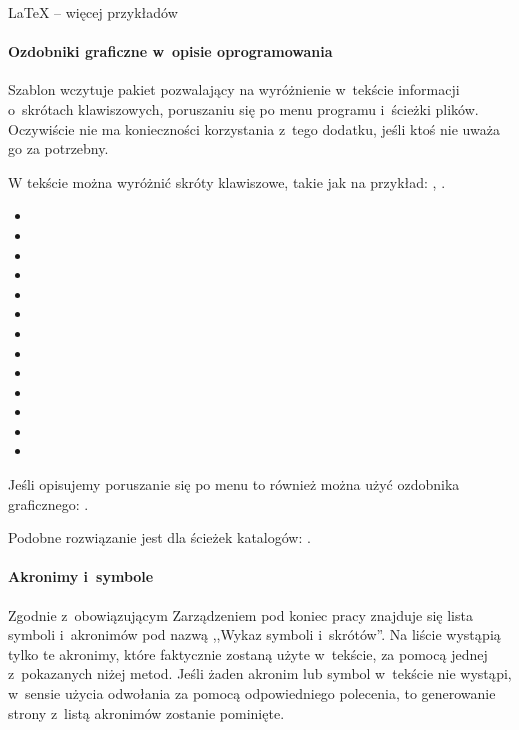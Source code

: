 \begin{easyappendix}{\LaTeX{} -- więcej przykładów}
\paragraph{Ozdobniki graficzne w~opisie oprogramowania}
Szablon wczytuje pakiet pozwalający na wyróżnienie w~tekście informacji o~skrótach klawiszowych, poruszaniu się po menu programu i~ścieżki plików. Oczywiście nie ma konieczności korzystania z~tego dodatku, jeśli ktoś nie uważa go za potrzebny.

W tekście można wyróżnić skróty klawiszowe, takie jak na przykład: , \keys{\ctrl, \Alt, \del}.
\begin{itemize}
	\item {}
	\item \keys{\Space} \keys{\SPACE}
	\item \keys{\backspace} \keys{\del} \keys{\backdel}
	\item \keys{\return} \keys{\enter}
	\item \keys{\shift} \keys{\capslock}
	\item \keys{\ctrl} \keys{\Alt} \keys{\AltGr}
	\item \keys{\tab}
	\item \keys{\esc} \keys{\oldesc}
	\item \keys{\winmenu}
	\item \keys{\arrowkey{^}} \keys{\arrowkeyup}
	\item {} \keys{\arrowkeydown}
	\item \keys{\arrowkey{>}} \keys{\arrowkeyright}
	\item \keys{\arrowkey{<}} \keys{\arrowkeyleft}
\end{itemize}

Jeśli opisujemy poruszanie się po menu to również można użyć ozdobnika graficznego: .

Podobne rozwiązanie jest dla ścieżek katalogów: .

\paragraph{Akronimy i~symbole}
Zgodnie z~obowiązującym Zarządzeniem pod koniec pracy znajduje się lista symboli i~akronimów pod nazwą ,,Wykaz symboli i~skrótów''. Na liście wystąpią tylko te akronimy, które faktycznie zostaną użyte w~tekście, za pomocą jednej z~pokazanych niżej metod. Jeśli żaden akronim lub symbol w~tekście nie wystąpi, w~sensie użycia odwołania za pomocą odpowiedniego polecenia, to generowanie strony z~listą akronimów zostanie pominięte.


\end{easyappendix}
